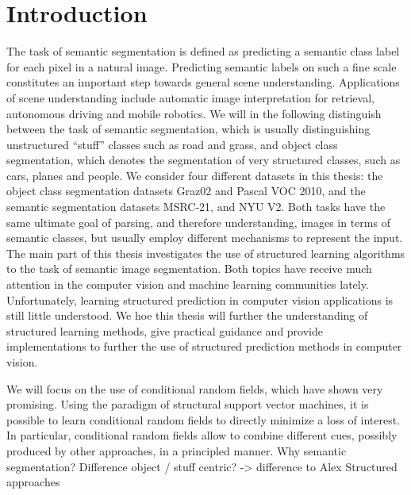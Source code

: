 \chapter{Introduction}
The task of semantic segmentation is defined as predicting a semantic class label
for each pixel in a natural image. Predicting semantic labels on such a fine scale
constitutes an important step towards general scene understanding.
%
Applications of scene understanding include automatic image interpretation for retrieval,
autonomous driving and mobile robotics.
%
We will in the following distinguish between the task of semantic segmentation,
which is usually distinguishing unstructured ``stuff'' classes such as road and
grass, and object class segmentation, which denotes the segmentation of very
structured classes, such as cars, planes and people.
We consider four different datasets in this thesis: the object class segmentation
datasets Graz02 and Pascal VOC 2010, and the semantic segmentation datasets MSRC-21,
and NYU V2.
%
Both tasks have the same ultimate goal of parsing, and therefore understanding, images
in terms of semantic classes, but usually employ  different mechanisms to represent the input.
%
The main part of this thesis investigates the use of structured learning
algorithms to the task of semantic image segmentation. Both topics have receive
much attention in the computer vision and machine learning communities lately.
Unfortunately, learning structured prediction in computer vision applications
is still little understood.  We hoe this thesis will further the understanding
of structured learning methods, give practical guidance and provide
implementations to further the use of structured prediction methods in computer
vision.


We will focus on the use of conditional random fields, which have shown very
promising.  Using the paradigm of structural support vector machines, it is
possible to learn conditional random fields to directly minimize a loss of
interest. In particular, conditional random fields allow to combine different
cues, possibly produced by other approaches, in a principled manner.
%
Why semantic segmentation? Difference object / stuff centric? -> difference to Alex
Structured approaches
%

